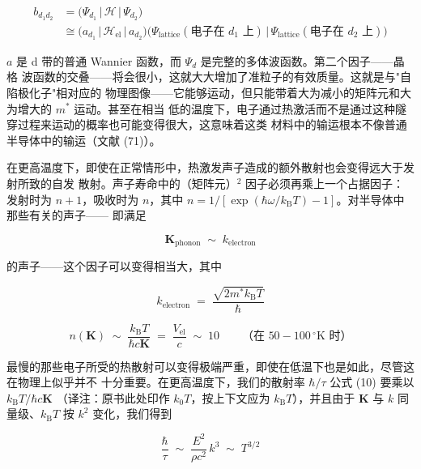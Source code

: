 \begin{align*}
b_{d_{1}d_{2}} &= \bigl(\Psi_{d_{1}}\,|\,\mathcal{H}\,|\,\Psi_{d_{2}}\bigr) \\
&\cong \bigl(a_{d_{1}}\,|\,\mathcal{H}_{\text{el}}\,|\,a_{d_{2}}\bigr) \bigl(\Psi_{\text{lattice}}(\text{电子在 } d_{1}\text{ 上})\,\big|\,\Psi_{\text{lattice}}(\text{电子在 } d_{2}\text{ 上})\bigr)
\end{align*}

$a$ 是 d 带的普通 Wannier 函数，而 $\Psi_{d}$ 是完整的多体波函数。第二个因子——晶格
波函数的交叠——将会很小，这就大大增加了准粒子的有效质量。这就是与"自陷极化子"相对应的
物理图像——它能够运动，但只能带着大为减小的矩阵元和大为增大的 $m^{*}$ 运动。甚至在相当
低的温度下，电子通过热激活而不是通过这种隧穿过程来运动的概率也可能变得很大，这意味着这类
材料中的输运根本不像普通半导体中的输运（文献 (71)）。

在更高温度下，即使在正常情形中，热激发声子造成的额外散射也会变得远大于发射所致的自发
散射。声子寿命中的（矩阵元）$^{2}$ 因子必须再乘上一个占据因子：发射时为 $n+1$，吸收时为
$n$，其中 $n = 1/[\exp(\hbar\omega/k_{\mathrm{B}}T) - 1]$。对半导体中那些有关的声子——
即满足

\begin{equation*}
\mathbf{K}_{\text{phonon}} \;\sim\; k_{\text{electron}}
\end{equation*}

的声子——这个因子可以变得相当大，其中

\begin{equation*}
k_{\text{electron}} \;=\; \frac{\sqrt{2m^{*}k_{\mathrm{B}}T}}{\hbar}
\end{equation*}

\begin{equation*}
n(\mathbf{K}) \;\sim\; \frac{k_{\mathrm{B}}T}{\hbar c\mathbf{K}} \;=\; \frac{V_{\text{el}}}{c} \;\sim\; 10 \qquad \text{（在 } 50{-}100\,^{\circ}\mathrm{K}\text{ 时）}
\end{equation*}

最慢的那些电子所受的热散射可以变得极端严重，即使在低温下也是如此，尽管这在物理上似乎并不
十分重要。在更高温度下，我们的散射率 $\hbar/\tau$ 公式 (10) 要乘以 $k_{\mathrm{B}}T/\hbar c\mathbf{K}$
（译注：原书此处印作 $k_{0}T$，按上下文应为 $k_{\mathrm{B}}T$），并且由于 $\mathbf{K}$
与 $k$ 同量级、$k_{\mathrm{B}}T$ 按 $k^{2}$ 变化，我们得到

\begin{equation*}
\frac{\hbar}{\tau} \;\sim\; \frac{E^{2}}{\rho c^{2}}\, k^{3} \;\sim\; T^{3/2}
\end{equation*}

